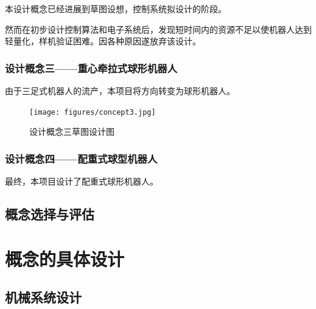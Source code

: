 \documentclass[a4paper]{ctexart}
\numberwithin{equation}{section}
\numberwithin{table}{section}
\numberwithin{figure}{section}
\begin{document}
本设计概念已经进展到草图设想，控制系统拟设计的阶段。

然而在初步设计控制算法和电子系统后，发现短时间内的资源不足以使机器人达到轻量化，样机验证困难。因各种原因遂放弃该设计。

\subsubsection{设计概念三——重心牵拉式球形机器人}

由于三足式机器人的流产，本项目将方向转变为球形机器人。

\begin{figure}[H]
  \begin{center}
    \texttt{[image: figures/concept3.jpg]}
  \end{center}
  \label{fig_concept_3}
  \caption{设计概念三草图设计图}
\end{figure}


\subsubsection{设计概念四——配重式球型机器人}

最终，本项目设计了配重式球形机器人。

\subsection{概念选择与评估}


\section{概念的具体设计}

\subsection{机械系统设计}
\end{document}
